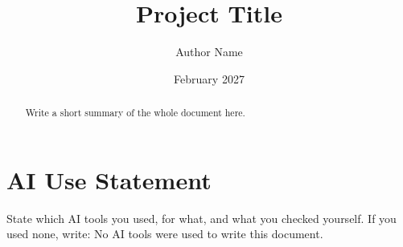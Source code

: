 \documentclass[11pt]{article}
\title{Project Title}
\author{Author Name}
\date{February 2027}
\theoremstyle{plain}
\theoremstyle{definition}
\begin{document}
\maketitle

\begin{abstract}
Write a short summary of the whole document here.
\end{abstract}

\tableofcontents





\printbibliography

\section*{AI Use Statement}
State which AI tools you used, for what, and what you checked yourself.
If you used none, write: No AI tools were used to write this document.
\end{document}
